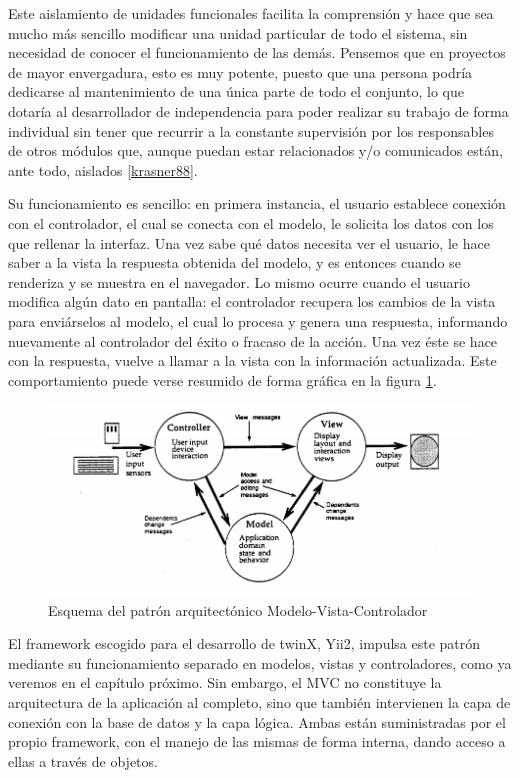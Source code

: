 Este aislamiento de unidades funcionales facilita la comprensión y hace que sea mucho más sencillo modificar una unidad particular de todo el sistema, sin necesidad de conocer el funcionamiento de las demás. Pensemos que en proyectos de mayor envergadura, esto es muy potente, puesto que una persona podría dedicarse al mantenimiento de una única parte de todo el conjunto, lo que dotaría al desarrollador de independencia para poder realizar su trabajo de forma individual sin tener que recurrir a la constante supervisión por los responsables de otros módulos que, aunque puedan estar relacionados y/o comunicados están, ante todo, aislados \ref{krasner88}.

Su funcionamiento es sencillo: en primera instancia, el usuario establece conexión con el controlador, el cual se conecta con el modelo, le solicita los datos con los que rellenar la interfaz. Una vez sabe qué datos necesita ver el usuario, le hace saber a la vista la respuesta obtenida del modelo, y es entonces cuando se renderiza y se muestra en el navegador. Lo mismo ocurre cuando el usuario modifica algún dato en pantalla: el controlador recupera los cambios de la vista para enviárselos al modelo, el cual lo procesa y genera una respuesta, informando nuevamente al controlador del éxito o fracaso de la acción. Una vez éste se hace con la respuesta, vuelve a llamar a la vista con la información actualizada. Este comportamiento puede verse resumido de forma gráfica en la figura \ref{fig:mvc}.

\begin{figure}
	\centering
	\includegraphics[width=\textwidth]{img/mvc}
	\caption[Esquema MVC]{Esquema del patrón arquitectónico Modelo-Vista-Controlador}
	\label{fig:mvc}
\end{figure}


El framework escogido para el desarrollo de twinX, Yii2, impulsa este patrón mediante su funcionamiento separado en modelos, vistas y controladores, como ya veremos en el capítulo próximo. Sin embargo, el MVC no constituye la arquitectura de la aplicación al completo, sino que también intervienen la capa de conexión con la base de datos y la capa lógica. Ambas están suministradas por el propio framework, con el manejo de las mismas de forma interna, dando acceso a ellas a través de objetos.